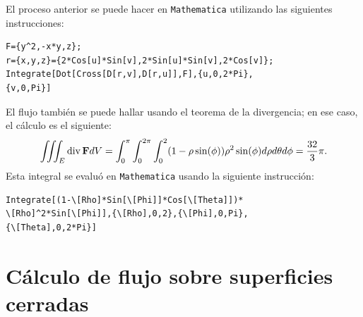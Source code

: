 El proceso anterior se puede hacer en \verb"Mathematica" utilizando las siguien\-tes instrucciones:

\begin{tcolorbox}[title=\bf Instrucción \verb"Mathematica"]\begin{Verbatim}[formatcom=\letraverbatim]
F={y^2,-x*y,z};
r={x,y,z}={2*Cos[u]*Sin[v],2*Sin[u]*Sin[v],2*Cos[v]};
Integrate[Dot[Cross[D[r,v],D[r,u]],F],{u,0,2*Pi},
{v,0,Pi}]
\end{Verbatim}
\end{tcolorbox}

El flujo también se puede hallar usando el teorema de la divergencia; en ese caso, el cálculo es el siguiente:
{\small
\[\iiint_E {\rm div} \,{\bf F} dV= \int _0^{\pi}\int _0^{2\pi}\int _0^{2} (1-\rho \sin (\phi))\rho^2\sin(\phi)d\rho d\theta d\phi = \frac{32}{3} \pi.\]}
Esta integral se evaluó en \verb"Mathematica" usando la siguiente instrucción:

\begin{tcolorbox}[title=\bf Instrucción \verb"Mathematica"]\begin{Verbatim}[formatcom=\letraverbatim]
Integrate[(1-\[Rho]*Sin[\[Phi]]*Cos[\[Theta]])*
\[Rho]^2*Sin[\[Phi]],{\[Rho],0,2},{\[Phi],0,Pi},
{\[Theta],0,2*Pi}]
\end{Verbatim}
\end{tcolorbox}

\section{Cálculo de flujo sobre superficies cerradas}

